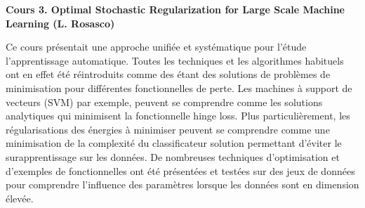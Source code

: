 \documentclass[a4paper, 11pt]{article}
\begin{document}
\begin{center} \textbf{Cours 3. Optimal Stochastic Regularization for Large Scale Machine Learning (L. Rosasco)} \end{center}

Ce cours présentait une approche unifiée et systématique pour l'étude l'apprentissage automatique. Toutes les techniques
et les algorithmes habituels ont en effet été réintroduits comme des étant des solutions de problèmes de minimisation
pour différentes fonctionnelles de perte. Les machines à support de vecteurs (SVM) par exemple, peuvent se comprendre
comme les solutions analytiques qui minimisent la fonctionnelle hinge loss. Plus particulièrement, les régularisations
des énergies à minimiser peuvent se comprendre comme une minimisation de la complexité du classificateur solution
permettant d'éviter le surapprentissage sur les données. De nombreuses techniques d'optimisation et d'exemples
de fonctionnelles ont été présentées et testées sur des jeux de données pour comprendre l'influence des paramètres 
lorsque les données sont en dimension élevée. 
\end{document}
